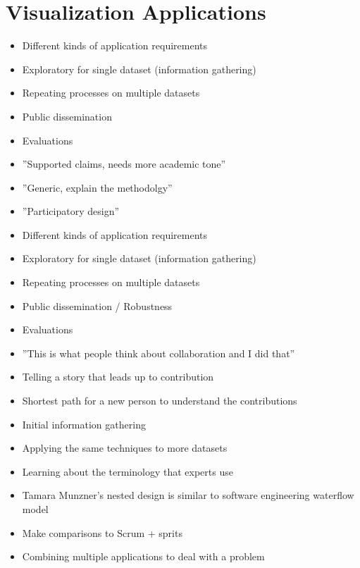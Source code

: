 \chapter{Visualization Applications}
\label{ch:visapp}

\begin{itemize}
\item Different kinds of application requirements
\item Exploratory for single dataset (information gathering)
\item Repeating processes on multiple datasets
\item Public dissemination
\item Evaluations
\end{itemize}

\begin{itemize}
\item ''Supported claims, needs more academic tone''
\item ''Generic, explain the methodolgy''
\item ''Participatory design''
\item Different kinds of application requirements
\item Exploratory for single dataset (information gathering)
\item Repeating processes on multiple datasets
\item Public dissemination / Robustness
\item Evaluations
\item ''This is what people think about collaboration and I did that''
\item Telling a story that leads up to contribution 
\item Shortest path for a new person to understand the contributions

\end{itemize}

\begin{itemize}
\item Initial information gathering
\item Applying the same techniques to more datasets
\item Learning about the terminology that experts use
\end{itemize}

\begin{itemize}
\item Tamara Munzner's nested design is similar to software engineering waterflow model
\item Make comparisons to Scrum + sprits
\item Combining multiple applications to deal with a problem \cite{rungta2013manyvis}
\end{itemize}
